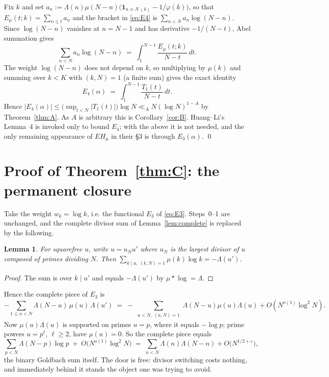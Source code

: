 \documentclass[11pt,a4paper]{article}
\theoremstyle{plain}
\newtheorem{lemma}[theorem]{Lemma}
\theoremstyle{definition}
\theoremstyle{remark}
\newcommand{\Emu}{E_\mu}
\begin{document}
Fix $k$ and set
$a_n:=\Lambda(n)\mu(N-n)\bigl(\mathbf 1_{n\equiv N\,(k)}-1/\varphi(k)\bigr)$,
so that $\Emu(t;k)=\sum_{n\le t}a_n$ and the bracket in \eqref{eq:E4}
is $\sum_{n<N}a_n\log(N-n)$. Since $\log(N-n)$ vanishes at $n=N-1$ and
has derivative $-1/(N-t)$, Abel summation gives
\[
  \sum_{n<N}a_n\log(N-n)\;=\;\int_{1}^{N-1}\frac{\Emu(t;k)}{N-t}\,dt .
\]
The weight $\log(N-n)$ does not depend on $k$, so multiplying by
$\mu(k)$ and summing over $k<K$ with $(k,N)=1$ (a finite sum) gives
the exact identity
\[
  E_4(\alpha)\;=\;\int_{1}^{N-1}\frac{T_1(t)}{N-t}\,dt .
\]
Hence $|E_4(\alpha)|\le\bigl(\sup_{t<N}|T_1(t)|\bigr)\log N
\ll_A N(\log N)^{1-A}$ by Theorem~\ref{thm:A}. As $A$ is arbitrary
this is Corollary~\ref{cor:B}. Huang--Li's Lemma~4 is invoked only to
bound $E_4$; with the above it is not needed, and the only remaining
appearance of $EH_\mu$ in their \S3 is through $E_3(\alpha)$. \qed

\section{Proof of \texorpdfstring{Theorem~\ref{thm:C}}{the identity}:
the permanent closure}%
\label{sec:C}

Take the weight $w_k=\log k$, i.e. the functional $E_3$ of
\eqref{eq:E3}. Steps~0--1 are unchanged, and the complete divisor sum
of Lemma~\ref{lem:complete} is replaced by the following.

\begin{lemma}\label{lem:completelog}
For squarefree $u$, write $u=u_Nu'$ where $u_N$ is the largest divisor
of $u$ composed of primes dividing $N$. Then
$\sum_{k\mid u,\ (k,N)=1}\mu(k)\log k=-\Lambda(u')$.
\end{lemma}

\begin{proof}
The sum is over $k\mid u'$ and equals $-\Lambda(u')$ by
$\mu*\log=\Lambda$.
\end{proof}

Hence the complete piece of $E_3$ is
\[
  -\sum_{1\le u<N}\Lambda(N-u)\,\mu(u)\,\Lambda(u')
  \;=\;-\sum_{\substack{u<N,\ (u,N)=1}}\Lambda(N-u)\mu(u)\Lambda(u)
        +O(N^{o(1)}\log^2 N).
\]
Now $\mu(u)\Lambda(u)$ is supported on primes $u=p$, where it equals
$-\log p$; prime powers $u=p^\ell$, $\ell\ge2$, have $\mu(u)=0$. So
the complete piece equals
\begin{equation}\label{eq:goldbachback}
  \sum_{p<N}\Lambda(N-p)\log p\;+\;O\bigl(N^{o(1)}\log^2N\bigr)
  \;=\;\sum_{n<N}\Lambda(n)\Lambda(N-n)+O\bigl(N^{1/2+\varepsilon}\bigr),
\end{equation}
the binary Goldbach sum itself. The door is free: divisor switching
costs nothing, and immediately behind it stands the object one was
trying to avoid.
\end{document}
